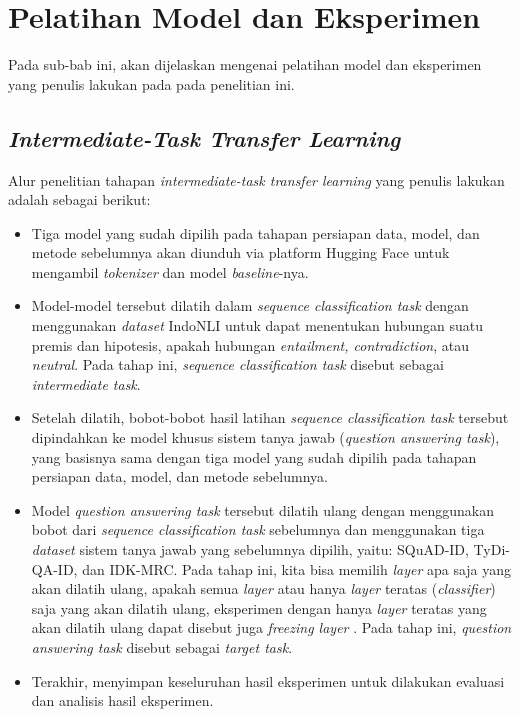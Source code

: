 \section{Pelatihan Model dan Eksperimen}
Pada sub-bab ini, akan dijelaskan mengenai pelatihan model dan eksperimen yang penulis lakukan pada pada penelitian ini. 

\subsection{\emph{Intermediate-Task Transfer Learning}}
Alur penelitian tahapan \emph{intermediate-task transfer learning} yang penulis lakukan adalah sebagai berikut:

\begin{itemize}
    
    \item Tiga model yang sudah dipilih pada tahapan persiapan data, model, dan metode sebelumnya akan diunduh via platform Hugging Face untuk mengambil \emph{tokenizer} dan model \emph{baseline}-nya.

    \item Model-model tersebut dilatih dalam \emph{sequence classification task} dengan menggunakan \emph{dataset} IndoNLI untuk dapat menentukan hubungan suatu premis dan hipotesis, apakah hubungan \emph{entailment, contradiction}, atau \emph{neutral}. Pada tahap ini, \emph{sequence classification task} disebut sebagai \emph{intermediate task}.

    \item Setelah dilatih, bobot-bobot hasil latihan \emph{sequence classification task} tersebut dipindahkan ke model khusus sistem tanya jawab (\emph{question answering task}), yang basisnya sama dengan tiga model yang sudah dipilih pada tahapan persiapan data, model, dan metode sebelumnya.

    \item Model \emph{question answering task} tersebut dilatih ulang dengan menggunakan bobot dari \emph{sequence classification task} sebelumnya dan menggunakan tiga \emph{dataset} sistem tanya jawab yang sebelumnya dipilih, yaitu: SQuAD-ID, TyDi-QA-ID, dan IDK-MRC. Pada tahap ini, kita bisa memilih \emph{layer} apa saja yang akan dilatih ulang, apakah semua \emph{layer} atau hanya \emph{layer} teratas (\emph{classifier}) saja yang akan dilatih ulang, eksperimen dengan hanya \emph{layer} teratas yang akan dilatih ulang dapat disebut juga \emph{freezing layer} \citep{lee2019elsa}. Pada tahap ini, \emph{question answering task} disebut sebagai \emph{target task}.

    \item Terakhir, menyimpan keseluruhan hasil eksperimen untuk dilakukan evaluasi dan analisis hasil eksperimen.

\end{itemize}


